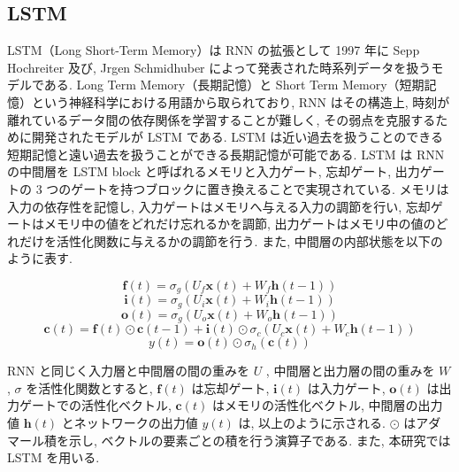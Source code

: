 \subsection{LSTM}

LSTM（Long Short-Term Memory）は RNN の拡張として 1997 年に Sepp Hochreiter 及び, Jrgen Schmidhuber によって発表された時系列データを扱うモデルである\cite{sankou5}.
Long Term Memory（長期記憶）と Short Term Memory（短期記憶）という神経科学における用語から取られており,
RNN はその構造上, 時刻が離れているデータ間の依存関係を学習することが難しく, その弱点を克服するために開発されたモデルが LSTM である. 
LSTM は近い過去を扱うことのできる短期記憶と遠い過去を扱うことができる長期記憶が可能である. 
LSTM は RNN の中間層を LSTM block と呼ばれるメモリと入力ゲート, 忘却ゲート, 出力ゲートの 3 つのゲートを持つブロックに置き換えることで実現されている.
メモリは入力の依存性を記憶し, 入力ゲートはメモリへ与える入力の調節を行い, 忘却ゲートはメモリ中の値をどれだけ忘れるかを調節, 出力ゲートはメモリ中の値のどれだけを活性化関数に与えるかの調節を行う. 
また, 中間層の内部状態を以下のように表す.

\begin{equation}
 \bm{f}(t) = σ_g(U_f\bm{x}(t) + W_f\bm{h}(t-1))
\end{equation}
\begin{equation}
 \bm{i}(t) = σ_g(U_i\bm{x}(t) + W_i\bm{h}(t-1))
\end{equation}
\begin{equation}
 \bm{o}(t) = σ_g(U_o\bm{x}(t) + W_o\bm{h}(t-1))
\end{equation}
\begin{equation}
 \bm{c}(t) = \bm{f}(t) \odot \bm{c}(t-1) + \bm{i}(t) \odot σ_c(U_c\bm{x}(t) + W_c\bm{h}(t-1))
\end{equation}
\begin{equation}
 y(t) = \bm{o}(t) \odot σ_h(\bm{c}(t))
\end{equation}
\vspace{0mm}

RNN と同じく入力層と中間層の間の重みを $U$ ,
中間層と出力層の間の重みを $W$ ,
$σ$ を活性化関数とすると, $\bm{f}(t)$ は忘却ゲート, $\bm{i}(t)$ は入力ゲート, $\bm{o}(t)$ は出力ゲートでの活性化ベクトル, $\bm{c}(t)$ はメモリの活性化ベクトル,  
中間層の出力値 $\bm{h}(t)$ とネットワークの出力値 $y(t)$ は, 以上のように示される. $\odot$ はアダマール積を示し, ベクトルの要素ごとの積を行う演算子である. 
また, 本研究では LSTM を用いる.

